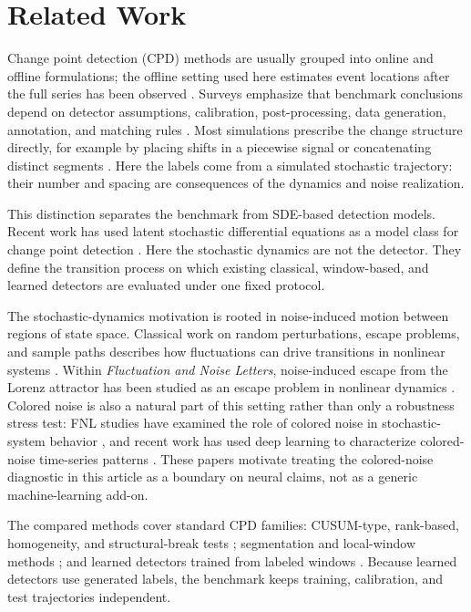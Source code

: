\section{Related Work}

Change point detection (CPD) methods are usually grouped into online and
offline formulations; the offline setting used here estimates event locations
after the full series has been observed \cite{adams2007}. Surveys emphasize
that benchmark conclusions depend on detector assumptions, calibration,
post-processing, data generation, annotation, and matching rules
\cite{aminikhanghahi2017,truong2020,vandenburg2020}. Most simulations prescribe
the change structure directly, for example by placing shifts in a piecewise
signal or concatenating distinct segments
\cite{killick2012,fryzlewicz2014,gharghabi2019,ermshaus2023clasp}. Here the
labels come from a simulated stochastic trajectory: their number and spacing
are consequences of the dynamics and noise realization.

This distinction separates the benchmark from SDE-based detection models.
Recent work has used latent stochastic differential equations as a model class
for change point detection \cite{ryzhikov2023latent_sde_cpd}. Here the
stochastic dynamics are not the detector. They define the transition process on
which existing classical, window-based, and learned detectors are evaluated
under one fixed protocol.

The stochastic-dynamics motivation is rooted in noise-induced motion between
regions of state space. Classical work on random perturbations, escape
problems, and sample paths describes how fluctuations can drive transitions in
nonlinear systems \cite{kramers1940,freidlin1998,berglund2006}. Within
\textit{Fluctuation and Noise Letters}, noise-induced escape from the Lorenz
attractor has been studied as an escape problem in nonlinear dynamics
\cite{anishchenko2001fnl_escape}. Colored noise is also a natural part of this
setting rather than only a robustness stress test: FNL studies have examined
the role of colored noise in stochastic-system behavior
\cite{valenti2005fnl_colored}, and recent work has used deep learning to
characterize colored-noise time-series patterns
\cite{barauna2024fnl_colored_deep}. These papers motivate treating the
colored-noise diagnostic in this article as a boundary on neural claims, not as
a generic machine-learning add-on.

The compared methods cover standard CPD families: CUSUM-type, rank-based,
homogeneity, and structural-break tests
\cite{page1954,pettitt1979,alexandersson1986,buishand1982,chow1960};
segmentation and local-window methods
\cite{killick2012,harchaoui2009,liu2013}; and learned detectors trained from
labeled windows \cite{li2024deepcpd}. Because learned detectors use generated
labels, the benchmark keeps training, calibration, and test trajectories
independent.
